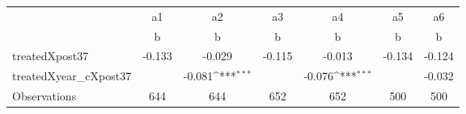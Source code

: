 {
\def\sym#1{\ifmmode^{#1}\else\(^{#1}\)\fi}
\begin{tabular}{l*{6}{c}}
\toprule
                    &          a1         &          a2         &          a3         &          a4         &          a5         &          a6         \\
                    &           b         &           b         &           b         &           b         &           b         &           b         \\
\midrule
treatedXpost37      &      -0.133         &      -0.029         &      -0.115         &      -0.013         &      -0.134         &      -0.124         \\
treatedXyear\_cXpost37&                     &      -0.081\sym{***}&                     &      -0.076\sym{***}&                     &      -0.032         \\
\midrule
Observations        &         644         &         644         &         652         &         652         &         500         &         500         \\
\bottomrule
\end{tabular}
}
